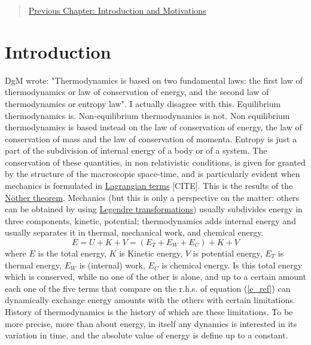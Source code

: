 \begin{quote}
\href{https://www.authorea.com/users/24891/articles/130803/_show_article}{Previous Chapter: Introduction  and Motivations}
\end{quote}

\section{Introduction}

DgM wrote: "Thermodynamics is based on two fundamental laws: the first law of thermodynamics or law of conservation of energy, and the second law of thermodynamics or entropy law".  I actually disagree with this. Equilibrium thermodynamics is. Non-equilibrium thermodynamics is not. Non equilibrium thermodynamics is based instead on the law of conservation of energy, the law of conservation of mass and the law of conservation of momenta. Entropy is just a part of the subdivision of internal energy of a body or of a system. The conservation of these quantities, in non relativistic conditions, is given for granted by the structure of the macroscopic space-time, and is particularly evident when mechanics is formulated in \href{https://en.wikipedia.org/wiki/Lagrangian_mechanics}{Lagrangian terms} [CITE]. This is the results of the \href{https://en.wikipedia.org/wiki/Noether%27s_theorem}{Nöther theorem}. 
Mechanics (but this is only a perspective on the matter: others can be obtained by using \href{https://en.wikipedia.org/wiki/Legendre_transformation}{Legendre transformations}) usually subdivides energy in three components, kinetic, potential; thermodynamics adds internal  energy and usually separates it in thermal, mechanical work, and chemical energy.
\begin{equation}
E = U  + K + V = (E_T + E_W + E_C) + K + V
\label{e_cons}
\end{equation}
where $E$ is the total energy, $K$ is Kinetic energy, $V$ is potential energy, $E_T$ is thermal energy, $E_W$ is (internal) work, $E_C$ is chemical energy. Is this total energy which is conserved, while no one of the other is alone, and up to a certain amount each one of the five terms that compare on the r.h.s. of equation (\ref{e_ref}) can dynamically exchange energy amounts with the others with certain limitations. 
History of thermodynamics is the history of which are these limitations. To be more precise, more than about energy, in itself any dynamics is interested in its variation in time, and the absolute value of energy is define up to a constant. 
